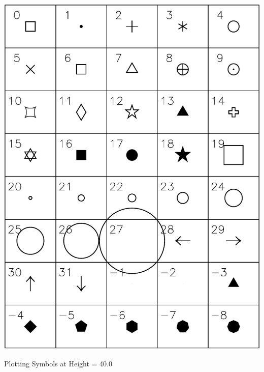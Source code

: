 \begin{table}
  \centering
  \includegraphics{plot-syms.pdf}
  \caption{Plotting Symbols at Height = 40.0}
  \label{t:plot.syms}
\end{table}

